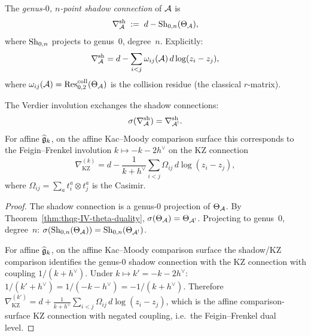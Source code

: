 \begin{definition}
The \emph{genus-$0$, $n$-point shadow connection} of $\mathcal{A}$ is
\begin{equation}%
\nabla^{\mathrm{sh}}_\cA
\;:=\;
d - \Sh_{0,n}(\Theta_\cA),
\end{equation}
where $\mathrm{Sh}_{0,n}$ projects to genus~$0$, degree~$n$. Explicitly:
\begin{equation}%
\nabla^{\mathrm{sh}}_\cA
= d - \sum_{i < j} \omega_{ij}(\cA)\, d\log(z_i - z_j),
\end{equation}
where $\omega_{ij}(\mathcal{A}) = \operatorname{Res}^{\mathrm{coll}}_{0,2}(\Theta_{\mathcal{A}})$
is the collision residue (the classical $r$-matrix).
\end{definition}

\begin{theorem}
\label{thm:thqg-IV-kz-duality}
The Verdier involution exchanges the shadow connections:
\begin{equation}%
\sigma(\nabla^{\mathrm{sh}}_\cA) = \nabla^{\mathrm{sh}}_{\cA^!}.
\end{equation}
For affine $\widehat{\mathfrak{g}}_k$, on the affine Kac--Moody comparison
surface this corresponds to the Feigin--Frenkel involution
$k \mapsto -k - 2h^\vee$ on the KZ connection
\[
\nabla_{\mathrm{KZ}}^{(k)}
= d - \frac{1}{k + h^\vee}
\sum_{i < j} \Omega_{ij}\, d\log(z_i - z_j),
\]
where $\Omega_{ij} = \sum_a t^a_i \otimes t^a_j$ is the Casimir.
\end{theorem}

\begin{proof}
The shadow connection is a genus-$0$ projection of $\Theta_{\mathcal{A}}$.
By Theorem~\ref{thm:thqg-IV-theta-duality}, $\sigma(\Theta_{\mathcal{A}}) = \Theta_{\mathcal{A}^!}$.
Projecting to genus~$0$, degree~$n$:
$\sigma(\mathrm{Sh}_{0,n}(\Theta_{\mathcal{A}})) = \mathrm{Sh}_{0,n}(\Theta_{\mathcal{A}^!})$.

For affine $\widehat{\mathfrak{g}}_k$, on the affine Kac--Moody comparison
surface the shadow/KZ comparison identifies the genus-$0$ shadow
connection with the KZ connection with coupling $1/(k + h^\vee)$. Under
$k \mapsto k' = -k - 2h^\vee$:
$1/(k' + h^\vee) = 1/(-k - h^\vee) = -1/(k + h^\vee)$.
Therefore
$\nabla_{\mathrm{KZ}}^{(k')} = d + \frac{1}{k+h^\vee}
\sum_{i<j}\Omega_{ij}\,d\log(z_i - z_j)$,
which is the affine comparison-surface KZ connection with negated
coupling, i.e.\ the Feigin--Frenkel dual level.
\end{proof}

